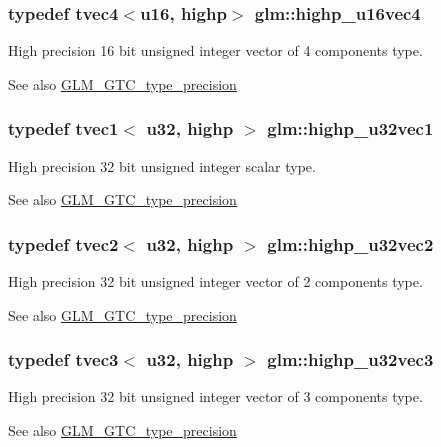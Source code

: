 \subsubsection[{highp\+\_\+u16vec4}]{\setlength{\rightskip}{0pt plus 5cm}typedef tvec4$<${\bf u16}, highp$>$ {\bf glm\+::highp\+\_\+u16vec4}}\label{namespaceglm_a9d020e4972de8e94684c49f2587b1235}
High precision 16 bit unsigned integer vector of 4 components type. \begin{DoxySeeAlso}{See also}
\hyperlink{group__gtc__type__precision}{G\+L\+M\+\_\+\+G\+T\+C\+\_\+type\+\_\+precision} 
\end{DoxySeeAlso}
\hypertarget{namespaceglm_a5d7ddaf3668bab7b214ff24a0196d678}{}
\subsubsection[{highp\+\_\+u32vec1}]{\setlength{\rightskip}{0pt plus 5cm}typedef tvec1$<$ {\bf u32}, highp $>$ {\bf glm\+::highp\+\_\+u32vec1}}\label{namespaceglm_a5d7ddaf3668bab7b214ff24a0196d678}
High precision 32 bit unsigned integer scalar type. \begin{DoxySeeAlso}{See also}
\hyperlink{group__gtc__type__precision}{G\+L\+M\+\_\+\+G\+T\+C\+\_\+type\+\_\+precision} 
\end{DoxySeeAlso}
\hypertarget{namespaceglm_a04892ac2070556582e80970024bfba5b}{}
\subsubsection[{highp\+\_\+u32vec2}]{\setlength{\rightskip}{0pt plus 5cm}typedef tvec2$<$ {\bf u32}, highp $>$ {\bf glm\+::highp\+\_\+u32vec2}}\label{namespaceglm_a04892ac2070556582e80970024bfba5b}
High precision 32 bit unsigned integer vector of 2 components type. \begin{DoxySeeAlso}{See also}
\hyperlink{group__gtc__type__precision}{G\+L\+M\+\_\+\+G\+T\+C\+\_\+type\+\_\+precision} 
\end{DoxySeeAlso}
\hypertarget{namespaceglm_a51f3fb62251b844d00526542257b0a0d}{}
\subsubsection[{highp\+\_\+u32vec3}]{\setlength{\rightskip}{0pt plus 5cm}typedef tvec3$<$ {\bf u32}, highp $>$ {\bf glm\+::highp\+\_\+u32vec3}}\label{namespaceglm_a51f3fb62251b844d00526542257b0a0d}
High precision 32 bit unsigned integer vector of 3 components type. \begin{DoxySeeAlso}{See also}
\hyperlink{group__gtc__type__precision}{G\+L\+M\+\_\+\+G\+T\+C\+\_\+type\+\_\+precision} 
\end{DoxySeeAlso}
\hypertarget{namespaceglm_ad6f92f734328c938625f719cec206a15}{}
